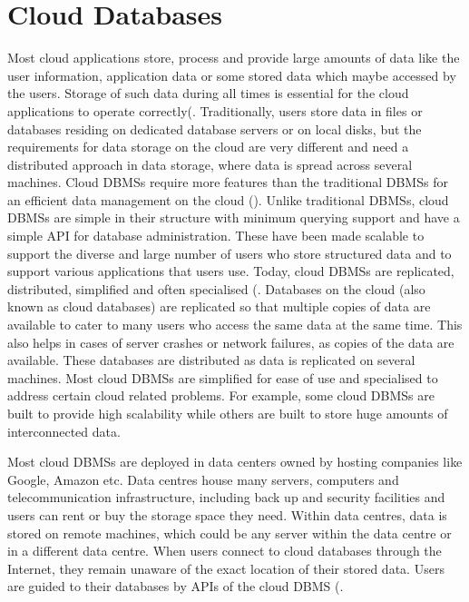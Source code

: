 \section{Cloud Databases}\label{s:cloud-databases}

Most cloud applications store,   process and provide large amounts of data like
the user information,   application data or some stored data which maybe
accessed by the users.  Storage of such data during all times is essential for
the cloud applications to operate correctly(.
Traditionally, users store data in files or databases residing on dedicated
database servers or on local disks, but the requirements for data storage on the
cloud are very different and need a distributed approach in data storage,  
where data is spread across several machines.  Cloud \acp{DBMS} require more
features than the traditional \acp{DBMS} for an efficient data management on the
cloud ().  Unlike traditional \acp{DBMS},   cloud \acp{DBMS}
are simple in their structure with minimum querying support and have a simple
API for database administration.  These have been made scalable to support the
diverse and large number of users who store structured data and to support
various applications that users use.  Today,   cloud \acp{DBMS} are replicated, 
 distributed, simplified and often specialised (. 
Databases on the cloud (also known as cloud databases) are replicated so that
multiple copies of data are available to cater to many users who access the same
data at the same time.  This also helps in cases of server crashes or network
failures,   as copies of the data are available.  These databases are
distributed as data is replicated on several machines.  Most cloud \acp{DBMS}
are simplified for ease of use and specialised to address certain cloud related
problems.  For example,   some cloud \acp{DBMS} are built to provide high
scalability while others are built to store huge amounts of interconnected data.

Most cloud \acp{DBMS} are deployed in data centers owned by hosting companies
like Google,   Amazon etc.  Data centres house many servers,   computers and
telecommunication infrastructure,   including back up and security facilities
and users can rent or buy the storage space they need.  Within data centres,  
data is stored on remote machines,   which could be any server within the data
centre or in a different data centre.  When users connect to cloud databases
through the Internet,   they remain unaware of the exact location of their stored
data.   Users are guided to their databases by \acp{API} of the cloud \ac{DBMS}
(. 


